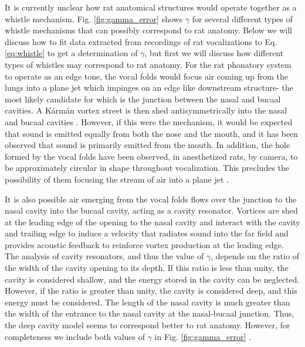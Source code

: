 \documentclass[superscriptaddress, twocolumn, prl]{revtex4}
\begin{document}
It is currently unclear how rat anatomical structures would operate together as a whistle mechanism. Fig. \ref{fig:gamma_error} shows $\gamma$ for several different types of whistle mechanisms that can possibly correspond to rat anatomy. Below we will discuss how to fit data extracted from recordings of rat vocalizations to Eq. \ref{eq:whistle} to get a determination of $\gamma$, but first we will discuss how different types of whistles may correspond to rat anatomy. For the rat phonatory system to operate as an edge tone, the vocal folds would focus air coming up from the lungs into a plane jet which impinges on an edge like downstream structure- the most likely candidate for which is the junction between the nasal and bucaal cavities. A K\'{a}rm\'{a}n vortex street is then shed antisymmetrically into the nasal and bucaal cavities \cite{Holger1977,Howe2008}. However, if this were the mechanism, it would be expected that sound is emitted equally from both the nose and the mouth, and it has been observed that sound is primarily emitted from the mouth. In addition, the hole formed by the vocal folds have been observed, in anesthetized rats, by camera, to be approximately circular in shape throughout vocalization. This precludes the possibility of them focusing the stream of air into a plane jet \cite{Brudzynski2010}.  

It is also possible air emerging from the vocal folds flows over the junction to the nasal cavity into the bucaal cavity, acting as a cavity resonator. Vortices are shed at the leading edge of the opening to the nasal cavity and interact with the cavity and trailing edge to induce a velocity that radiates sound into the far field and provides acoustic feedback to reinforce vortex production at the leading edge. The analysis of cavity resonators, and thus the value of $\gamma$, depends on the ratio of the width of the cavity opening to its depth. If this ratio is less than unity, the cavity is considered shallow, and the energy stored in the cavity can be neglected. However, if the ratio is greater than unity, the cavity is considered deep, and this energy must be considered. The length of the nasal cavity is much greater than the width of the entrance to the nasal cavity at the nasal-bucaal junction. Thus, the deep cavity model seems to correspond better to rat anatomy. However, for completeness we include both values of $\gamma$ in Fig. \ref{fig:gamma_error} \cite{Howe2008, Brudzynski2010}.
\end{document}
